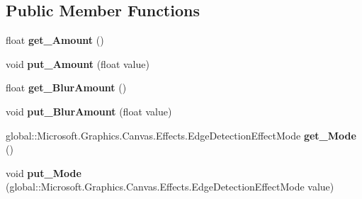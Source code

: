 \subsection*{Public Member Functions}
\begin{DoxyCompactItemize}
\item 
\mbox{\label{interface_microsoft_1_1_graphics_1_1_canvas_1_1_effects_1_1_i_edge_detection_effect_a4e9c33fd362cec60d6638ddd1aeadaab}} 
float {\bfseries get\+\_\+\+Amount} ()
\item 
\mbox{\label{interface_microsoft_1_1_graphics_1_1_canvas_1_1_effects_1_1_i_edge_detection_effect_a25aa355d10926221fb18d7b5ab5d121b}} 
void {\bfseries put\+\_\+\+Amount} (float value)
\item 
\mbox{\label{interface_microsoft_1_1_graphics_1_1_canvas_1_1_effects_1_1_i_edge_detection_effect_a34600b9441ec9b1822069023c004b06d}} 
float {\bfseries get\+\_\+\+Blur\+Amount} ()
\item 
\mbox{\label{interface_microsoft_1_1_graphics_1_1_canvas_1_1_effects_1_1_i_edge_detection_effect_ae34ee491a4a76a40ac93a1257d408521}} 
void {\bfseries put\+\_\+\+Blur\+Amount} (float value)
\item 
\mbox{\label{interface_microsoft_1_1_graphics_1_1_canvas_1_1_effects_1_1_i_edge_detection_effect_af4eed9893a7039265777bc63d06a5dad}} 
global\+::\+Microsoft.\+Graphics.\+Canvas.\+Effects.\+Edge\+Detection\+Effect\+Mode {\bfseries get\+\_\+\+Mode} ()
\item 
\mbox{\label{interface_microsoft_1_1_graphics_1_1_canvas_1_1_effects_1_1_i_edge_detection_effect_ab506181e7ae373678c372e670ca4e7dc}} 
void {\bfseries put\+\_\+\+Mode} (global\+::\+Microsoft.\+Graphics.\+Canvas.\+Effects.\+Edge\+Detection\+Effect\+Mode value)
\item 

\end{DoxyCompactItemize}
